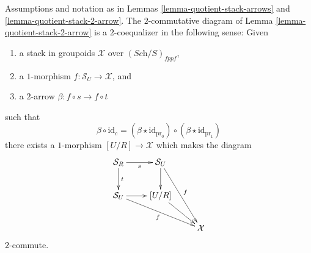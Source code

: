 \begin{lemma}
\label{lemma-quotient-stack-2-coequalizer}
Assumptions and notation as in
Lemmas \ref{lemma-quotient-stack-arrows} and
\ref{lemma-quotient-stack-2-arrow}.
The $2$-commutative diagram of Lemma \ref{lemma-quotient-stack-2-arrow}
is a $2$-coequalizer in the following sense:
Given
\begin{enumerate}
\item a stack in groupoids $\mathcal{X}$ over $(\textit{Sch}/S)_{fppf}$,
\item a $1$-morphism $f : \mathcal{S}_U \to \mathcal{X}$, and
\item a $2$-arrow $\beta : f \circ s \to f \circ t$
\end{enumerate}
such that
$$
\beta \circ \text{id}_c = 
(\beta \star \text{id}_{\text{pr}_0})
\circ
(\beta \star \text{id}_{\text{pr}_1})
$$
there exists a $1$-morphism $[U/R] \to \mathcal{X}$ which makes the diagram
$$
\xymatrix{
\mathcal{S}_R \ar[r]_s \ar[d]^t & \mathcal{S}_U \ar[d] \ar[ddr]^f \\
\mathcal{S}_U \ar[r] \ar[rrd]_f & [U/R] \ar[rd] \\
& & \mathcal{X}
}
$$
$2$-commute.
\end{lemma}

